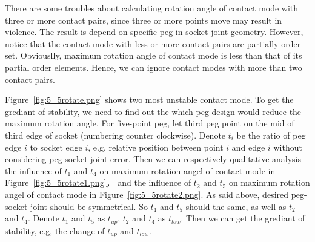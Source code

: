 There are some troubles about calculating rotation angle of contact mode with three or more contact pairs, since three or more points move may result in violence. The result is depend on specific peg-in-socket joint geometry. However, notice that the contact mode with less or more contact pairs are partially order set. Obviouslly, maximum rotation angle of contact mode is less than that of its partial order elements. Hence, we can ignore contact modes with more than two contact pairs. 

Figure~\ref{fig:5_5rotate.png} shows two most unstable contact mode. To get the grediant of stability, we need to find out the which peg design would reduce the maximum rotation angle. For five-point peg, let third peg point on the mid of third edge of socket (numbering counter clockwise).  Denote ${t}_{i}$ be the ratio of peg edge ${i}$ to socket edge ${i}$, e.g, relative position between point ${i}$ and edge ${i}$ without considering peg-socket joint error. Then we can respectively qualitative analysis the influence of ${t}_1$ and ${t}_4$ on maximum rotation angel of contact mode in Figure~\ref{fig:5_5rotate1.png}， and the influence of ${t}_2$ and ${t}_5$ on maximum rotation angel of contact mode in Figure~\ref{fig:5_5rotate2.png}. As said above, desired peg-socket joint should be symmetrical. So ${t}_1$ and ${t}_5$ should the same, as well as ${t}_2$ and ${t}_4$. Denote ${t}_1$ and ${t}_5$ as ${t}_{up}$, ${t}_2$ and ${t}_4$ as ${t}_{low}$. Then we can get the grediant of stability, e.g, the change of ${t}_{up}$ and ${t}_{low}$.

